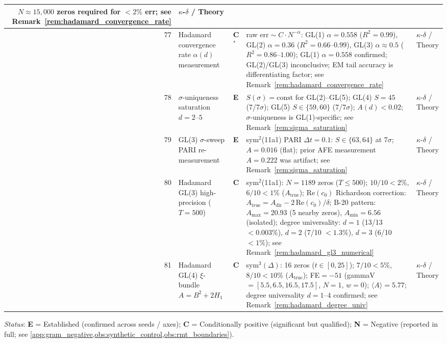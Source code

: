 \documentclass[11pt, a4paper]{article}
\theoremstyle{definition}
\theoremstyle{plain}
\begin{document}
\begin{center}
\begin{longtable}{@{}r l l p{4.2cm} l@{}}
   $N{\approx}15{,}000$ zeros required for $<2\%$ err;
   see Remark~\ref{rem:hadamard_convergence_rate}
   & $\kappa$-$\delta$ / Theory \\
\midrule
77 & Hadamard convergence rate $\alpha(d)$ measurement & \textbf{C}$^*$ &
   raw $\mathrm{err} \sim C{\cdot}N^{-\alpha}$: GL(1) $\alpha{=}0.558$ ($R^2{=}0.99$),
   GL(2) $\alpha{=}0.36$ ($R^2{=}0.66$--$0.99$),
   GL(3) $\alpha{\approx}0.5$ ($R^2{=}0.86$--$1.00$);
   GL(1) $\alpha{=}0.558$ confirmed; GL(2)/GL(3) inconclusive;
   EM tail accuracy is differentiating factor;
   see Remark~\ref{rem:hadamard_convergence_rate}
   & $\kappa$-$\delta$ / Theory \\
\midrule
78 & $\sigma$-uniqueness saturation $d=2$--$5$ & \textbf{E} &
   $S(\sigma){=}\text{const}$ for GL(2)--GL(5); GL(4) $S{=}45$ (7/7$\sigma$);
   GL(5) $S{\in}\{59,60\}$ (7/7$\sigma$); $A(d){<}0.02$;
   $\sigma$-uniqueness is GL(1)-specific;
   see Remark~\ref{rem:sigma_saturation}
   & $\kappa$-$\delta$ / Theory \\
\midrule
79 & GL(3) $\sigma$-sweep PARI re-measurement & \textbf{E} &
   sym$^2$(11a1) PARI $\Delta t{=}0.1$: $S{\in}\{63,64\}$ at 7$\sigma$;
   $A{=}0.016$ (flat); prior AFE measurement $A{=}0.222$ was artifact;
   see Remark~\ref{rem:sigma_saturation}
   & $\kappa$-$\delta$ / Theory \\
\midrule
80 & Hadamard GL(3) high-precision ($T{=}500$) & \textbf{C} &
   sym$^2$(11a1): $N{=}1189$ zeros ($T{\leq}500$); $10/10{<}2\%$, $6/10{<}1\%$ ($A_{\text{true}}$);
   Re$(c_0)$ Richardson correction: $A_{\text{true}} = A_{\text{dir}} - 2\,\text{Re}(c_0)/\delta$;
   B-20 pattern: $A_{\max}{=}20.93$ (5 nearby zeros), $A_{\min}{=}6.56$ (isolated);
   degree universality: $d{=}1$ (13/13 ${<}0.003\%$), $d{=}2$ (7/10 ${<}1.3\%$), $d{=}3$ (6/10 ${<}1\%$);
   see Remark~\ref{rem:hadamard_gl3_numerical}
   & $\kappa$-$\delta$ / Theory \\
\midrule
81 & Hadamard GL(4) $\xi$-bundle $A{=}B^2{+}2H_1$ & \textbf{C} &
   sym$^3(\Delta)$: 16 zeros ($t{\in}[0,25]$); $7/10{<}5\%$, $8/10{<}10\%$ ($A_{\text{true}}$);
   FE${=}-51$ (gammaV${=}[5.5,6.5,16.5,17.5]$, $N{=}1$, $w{=}0$);
   $\langle A\rangle{=}5.77$; degree universality $d{=}1$--$4$ confirmed;
   see Remark~\ref{rem:hadamard_degree_univ}
   & $\kappa$-$\delta$ / Theory \\
\end{longtable}
\end{center}

\noindent\textit{Status}: \textbf{E} = Established (confirmed across seeds / axes);
\textbf{C} = Conditionally positive (significant but qualified);
\textbf{N} = Negative (reported in full; see
\cref{app:gram_negative,obs:synthetic_control,obs:rmt_boundaries}).
\end{document}
